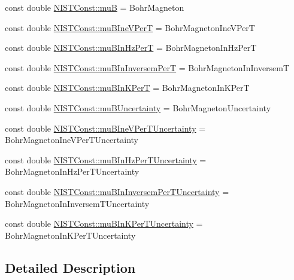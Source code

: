 \begin{DoxyCompactItemize}
\item 
const double \hyperlink{group___n_i_s_t_const-_bohr_magneton_gab42ee32e5e0323fc6268a5e14ac40b39}{N\+I\+S\+T\+Const\+::muB} = Bohr\+Magneton
\item 
const double \hyperlink{group___n_i_s_t_const-_bohr_magneton_gad2bd4164d07de53146b14398c6d4790d}{N\+I\+S\+T\+Const\+::mu\+B\+Ine\+V\+PerT} = Bohr\+Magneton\+Ine\+V\+PerT
\item 
const double \hyperlink{group___n_i_s_t_const-_bohr_magneton_gac590bf03985de37cfaeea7982dac2aa8}{N\+I\+S\+T\+Const\+::mu\+B\+In\+Hz\+PerT} = Bohr\+Magneton\+In\+Hz\+PerT
\item 
const double \hyperlink{group___n_i_s_t_const-_bohr_magneton_ga4d426841ef01963272df91bd0534a966}{N\+I\+S\+T\+Const\+::mu\+B\+In\+Inversem\+PerT} = Bohr\+Magneton\+In\+InversemT
\item 
const double \hyperlink{group___n_i_s_t_const-_bohr_magneton_ga51473ab154d1c4e8e9afca84952db156}{N\+I\+S\+T\+Const\+::mu\+B\+In\+K\+PerT} = Bohr\+Magneton\+In\+K\+PerT
\item 
const double \hyperlink{group___n_i_s_t_const-_bohr_magneton_ga6f7d483b5984d92f63b7fbe199fa3985}{N\+I\+S\+T\+Const\+::mu\+B\+Uncertainty} = Bohr\+Magneton\+Uncertainty
\item 
const double \hyperlink{group___n_i_s_t_const-_bohr_magneton_ga3090988be27d3988c99418e32a538a18}{N\+I\+S\+T\+Const\+::mu\+B\+Ine\+V\+Per\+T\+Uncertainty} = Bohr\+Magneton\+Ine\+V\+Per\+T\+Uncertainty
\item 
const double \hyperlink{group___n_i_s_t_const-_bohr_magneton_gadcf78ed6cafce3517c8dc7d308c06cc2}{N\+I\+S\+T\+Const\+::mu\+B\+In\+Hz\+Per\+T\+Uncertainty} = Bohr\+Magneton\+In\+Hz\+Per\+T\+Uncertainty
\item 
const double \hyperlink{group___n_i_s_t_const-_bohr_magneton_ga51cabaa66ef3fd011187bc9ad5226cc8}{N\+I\+S\+T\+Const\+::mu\+B\+In\+Inversem\+Per\+T\+Uncertainty} = Bohr\+Magneton\+In\+Inversem\+T\+Uncertainty
\item 
const double \hyperlink{group___n_i_s_t_const-_bohr_magneton_ga3e329894e17506d60948fd563cee0368}{N\+I\+S\+T\+Const\+::mu\+B\+In\+K\+Per\+T\+Uncertainty} = Bohr\+Magneton\+In\+K\+Per\+T\+Uncertainty
\end{DoxyCompactItemize}


\subsection{Detailed Description}


